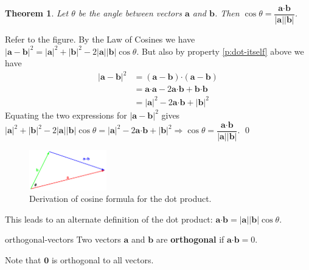 \documentclass[letterpaper, 11pt, openany]{book}
\newcommand{\scdot}{\boldsymbol{\cdot}}
\theoremstyle{mytheoremstyle}
\newtheorem{theorem}{Theorem}[section]
\renewenvironment{proof}{{\par \sffamily \smaller \fontseries{b}\selectfont Proof}}{\hfill\qed}
\theoremstyle{myexamplestyle}
\begin{document}
\begin{theorem}
    Let $\theta$ be the angle between vectors $\mathbf{a}$ and $\mathbf{b}$. Then $\cos \theta = \dfrac{\mathbf{a} \scdot \mathbf{b}}{|\mathbf{a}||\mathbf{b}|}$.
\end{theorem}
\begin{proof}
    Refer to the figure. By the Law of Cosines we have $|\mathbf{a}-\mathbf{b}|^{2} = |\mathbf{a}|^{2} + |\mathbf{b}|^{2} - 2|\mathbf{a}||\mathbf{b}|\cos \theta$. But also by property \ref{p:dot-itself} above we have 
    \begin{align*}
        |\mathbf{a}-\mathbf{b}|^{2}     &= (\mathbf{a}-\mathbf{b}) \scdot (\mathbf{a}-\mathbf{b})\\
                                        &= \mathbf{a} \scdot \mathbf{a} - 2 \mathbf{a}\scdot \mathbf{b} + \mathbf{b}\scdot \mathbf{b}\\
                                        &= |\mathbf{a}|^{2} - 2 \mathbf{a}\scdot \mathbf{b} + |\mathbf{b}|^{2}
    \end{align*}
    Equating the two expressions for $|\mathbf{a}-\mathbf{b}|^{2}$ gives $|\mathbf{a}|^{2} + |\mathbf{b}|^{2} - 2|\mathbf{a}||\mathbf{b}|\cos \theta = |\mathbf{a}|^{2} - 2 \mathbf{a}\scdot \mathbf{b} + |\mathbf{b}|^{2} \Rightarrow \cos \theta = \dfrac{\mathbf{a} \scdot \mathbf{b}}{|\mathbf{a}||\mathbf{b}|}$.
\end{proof}

\begin{figure}[htbp]
    \centering
        \includegraphics[width=0.3\textwidth]{Figures/dotprodcosine.pdf}
    \caption{Derivation of cosine formula for the dot product.}
    \label{f:dotprodcosine}
\end{figure}

This leads to an alternate definition of the dot product: \(\mathbf{a} \scdot \mathbf{b} = |\mathbf{a}||\mathbf{b}|\cos \theta\).

\begin{definition}{}{orthogonal-vectors}
    Two vectors $\mathbf{a}$ and $\mathbf{b}$ are \textbf{orthogonal} if $\mathbf{a} \scdot \mathbf{b} = 0$.
\end{definition}

Note that \(\mathbf{0}\) is orthogonal to all vectors.
\end{document}
